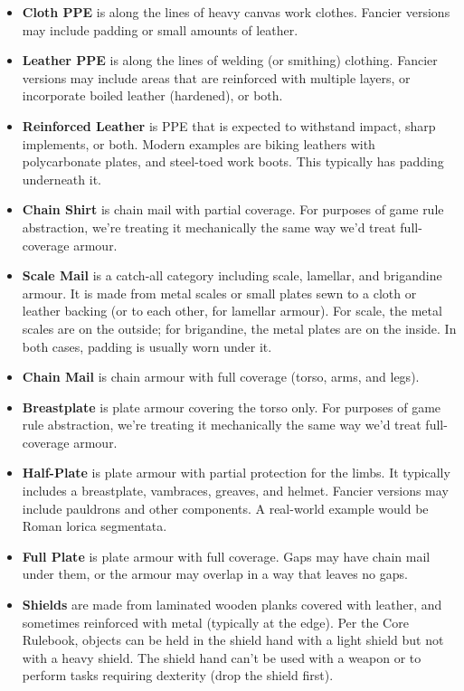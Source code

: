 \begin{itemize}
%
\item \textbf{Cloth PPE} is along the lines of heavy canvas work clothes.
Fancier versions may include padding or small amounts of leather.
%
\item \textbf{Leather PPE} is along the lines of welding (or smithing)
clothing. Fancier versions may include areas that are reinforced with
multiple layers, or incorporate boiled leather (hardened), or both.
%
\item \textbf{Reinforced Leather} is PPE that is expected to withstand
impact, sharp implements, or both. Modern examples are biking leathers
with polycarbonate plates, and steel-toed work boots. This typically has
padding underneath it.
%
\item \textbf{Chain Shirt} is chain mail with partial coverage. For
purposes of game rule abstraction, we're treating it mechanically the same
way we'd treat full-coverage armour.
%
\item \textbf{Scale Mail} is a catch-all category including scale, lamellar,
and brigandine armour. It is made from metal scales or small plates sewn
to a cloth or leather backing (or to each other, for lamellar armour). For
scale, the metal scales are on the outside; for brigandine, the metal plates
are on the inside. In both cases, padding is usually worn under it.
%
\item \textbf{Chain Mail} is chain armour with full coverage (torso, arms,
and legs).
%
\item \textbf{Breastplate} is plate armour covering the torso only. For
purposes of game rule abstraction, we're treating it mechanically the
same way we'd treat full-coverage armour.
%
\item \textbf{Half-Plate} is plate armour with partial protection for
the limbs. It typically includes a breastplate, vambraces, greaves, and
helmet. Fancier versions may include pauldrons and other components. A
real-world example would be Roman lorica segmentata.
%
\item \textbf{Full Plate} is plate armour with full coverage. Gaps may
have chain mail under them, or the armour may overlap in a way that leaves
no gaps.
%
\item \textbf{Shields} are made from laminated wooden planks covered with
leather, and sometimes reinforced with metal (typically at the edge). Per
the Core Rulebook, objects can be held in the shield hand with a light
shield but not with a heavy shield. The shield hand can't be used with
a weapon or to perform tasks requiring dexterity (drop the shield first).
%
\end{itemize}
%

